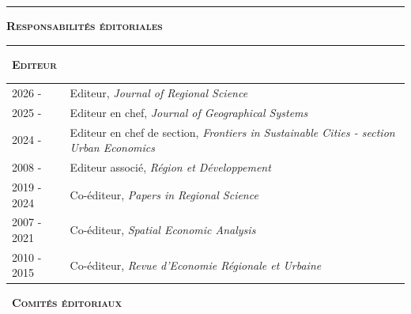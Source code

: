 \documentclass[a4paper,12pt]{article}
\newcommand{\titre}[1]{%
	\bigskip
	\noindent \rule[2mm]{\textwidth}{0.5pt}
	\textbf{\textsc{\large #1}} \\
	\noindent \rule[1mm]{\textwidth}{0.5pt}
	}
\newcommand{\smalltitre}[1]{%
	\noindent \textbullet~\textsc{\textbf{#1}}
	\smallskip
	}
\begin{document}

\titre{Responsabilités éditoriales}


\smalltitre{Editeur}

\noindent \begin{longtable}{@{}p{\annee}p{\texte}@{}}
2026 - 	& Editeur, \textit{Journal of Regional Science} \\
2025 - 	& Editeur en chef, \textit{Journal of Geographical Systems} \\
2024 - 	& Editeur en chef de section, \textit{Frontiers in Sustainable Cities - section Urban Economics} \\
2008 - 	& Editeur associé, \textit{Région et Développement} \\
2019 - 2024 & Co-éditeur, \textit{Papers in Regional Science} \\
2007 - 2021 & Co-éditeur, \textit{Spatial Economic Analysis} \\
2010 - 2015 & Co-éditeur, \textit{Revue d'Economie Régionale et Urbaine} \\
\end{longtable}


\smalltitre{Comités éditoriaux}
	
\end{document}
